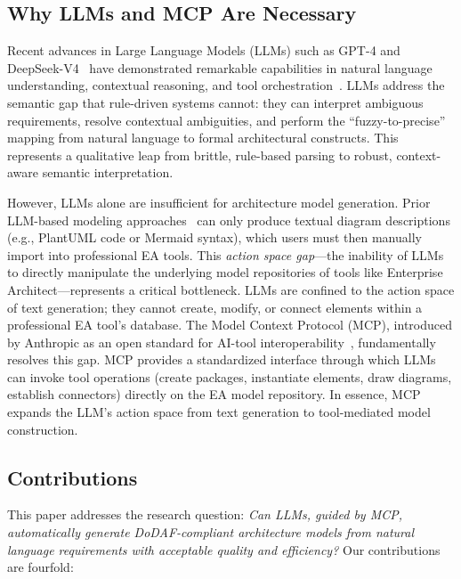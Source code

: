 \documentclass{ieeeaccess}
\begin{document}
\subsection{Why LLMs and MCP Are Necessary}

Recent advances in Large Language Models (LLMs) such as GPT-4 and DeepSeek-V4~\cite{deepseek} have demonstrated remarkable capabilities in natural language understanding, contextual reasoning, and tool orchestration~\cite{llm_survey}. LLMs address the semantic gap that rule-driven systems cannot: they can interpret ambiguous requirements, resolve contextual ambiguities, and perform the ``fuzzy-to-precise'' mapping from natural language to formal architectural constructs. This represents a qualitative leap from brittle, rule-based parsing to robust, context-aware semantic interpretation.

However, LLMs alone are insufficient for architecture model generation. Prior LLM-based modeling approaches~\cite{gpt4_uml,llm_requirements} can only produce textual diagram descriptions (e.g., PlantUML code or Mermaid syntax), which users must then manually import into professional EA tools. This \emph{action space gap}---the inability of LLMs to directly manipulate the underlying model repositories of tools like Enterprise Architect---represents a critical bottleneck. LLMs are confined to the action space of text generation; they cannot create, modify, or connect elements within a professional EA tool's database. The Model Context Protocol (MCP), introduced by Anthropic as an open standard for AI-tool interoperability~\cite{mcp_spec}, fundamentally resolves this gap. MCP provides a standardized interface through which LLMs can invoke tool operations (create packages, instantiate elements, draw diagrams, establish connectors) directly on the EA model repository. In essence, MCP expands the LLM's action space from text generation to tool-mediated model construction.

\subsection{Contributions}

This paper addresses the research question: \textit{Can LLMs, guided by MCP, automatically generate DoDAF-compliant architecture models from natural language requirements with acceptable quality and efficiency?} Our contributions are fourfold:
\end{document}
